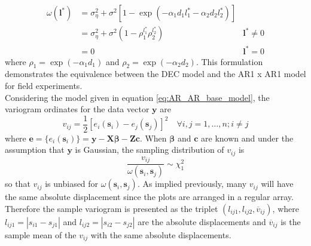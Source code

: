 \begin{equation}
    \begin{aligned}
        \omega\left(\mathbf{l}^{*}\right) & = \sigma_{\eta}^{2}+\sigma^{2}\left[1-\exp \left(-\alpha_{1} d_{1} l_{1}^{*}-\alpha_{2} d_{2} l_{2}^{*}\right)\right] 
        &  \\
        & = \sigma_{\eta}^{2}+\sigma^{2}\left(1-\rho_{1}^{l_{1}^{*}} \rho_{2}^{l_{2}^{*}}\right) 
        & \mathbf{l}^* \neq 0 \\
        & = 0
        & \mathbf{l}^* = 0 
    \end{aligned}
\end{equation}
where $\rho_{1}=\exp \left(-\alpha_{1} d_{1}\right)$ and $\rho_{2}=\exp \left(-\alpha_{2} d_{2}\right)$. This formulation demonstrates the equivalence between the DEC model and the AR1 x AR1 model for field experiments.\\
Considering the model given in equation \ref{eq:AR_AR_base_model}, the variogram ordinates for the data vector $\mathbf{y}$ are 
\begin{equation}
    v_{i j}=\frac{1}{2}\left[e_{i}\left(\mathbf{s}_{i}\right)-e_{j}\left(\mathbf{s}_{j}\right)\right]^{2} \quad \forall i, j=1, \ldots, n ; i \neq j
    \label{eq:sample_vario_ordinates}
\end{equation}
where $\mathbf{e}=\{e_i(\mathbf{s}_i)\} = \mathbf{y} - \mathbf{X}\boldsymbol{\beta} - \mathbf{Zc}$. When $\boldsymbol{\beta}$ and $\mathbf{c}$ are known and under the assumption that $\mathbf{y}$ is Gaussian, the sampling distribution of $v_{i j}$ is 
\begin{equation}
    \frac{v_{i j}}{\omega\left(\mathbf{s}_{i}, \mathbf{s}_{j}\right)} \sim \chi_{1}^{2}
\end{equation}
so that $v_{i j}$ is unbiased for $\omega\left(\mathbf{s}_{i}, \mathbf{s}_{j}\right)$. As implied previously, many $v_{ij}$ will have the same absolute displacement since the plots are arranged in a regular array. Therefore the sample variogram is presented as the triplet $\left(l_{i j 1}, l_{i j 2}, \overline{v}_{i j}\right)$, where $l_{i j 1}=\left|s_{i 1}-s_{j 1}\right|$ and $l_{i j 2}=\left|s_{i 2}-s_{j 2}\right|$ are the absolute displacements and $\overline{v}_{ij}$ is the sample mean of the $v_{ij}$ with the same absolute displacements.


